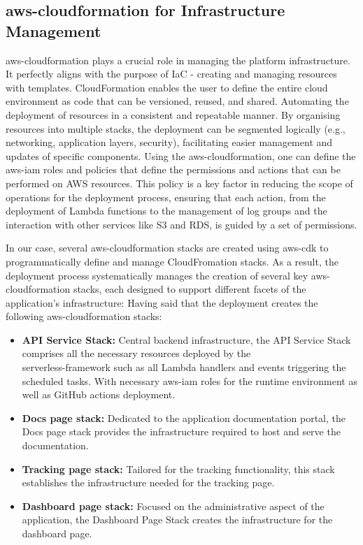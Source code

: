 \subsection{\gls{aws-cloudformation} for Infrastructure Management}
\label{subsec:aws-cloudformation-infrastructure}

\gls{aws-cloudformation} plays a crucial role in managing the platform infrastructure.
It perfectly aligns with the purpose of \ac{IaC} - creating and managing resources with templates.
CloudFormation enables the user to define the entire cloud environment as code that can be versioned, reused, and shared. 
Automating the deployment of resources in a consistent and repeatable manner.
By organising resources into multiple stacks, the deployment can be segmented logically (e.g., networking, application layers, security), facilitating easier management and updates of specific components.
Using the \gls{aws-cloudformation}, one can define the \gls{aws-iam} roles and policies that define the permissions and actions that can be performed on \ac{AWS} resources.
This policy is a key factor in reducing the scope of operations for the deployment process, ensuring that each action, from the deployment of Lambda functions to the management of log groups and the interaction with other services like \ac{S3} and \ac{RDS}, is guided by a set of permissions. 

In our case, several \gls{aws-cloudformation} stacks are created using \gls{aws-cdk} to programmatically define and manage CloudFromation stacks.
As a result, the deployment process systematically manages the creation of several key \gls{aws-cloudformation} stacks, each designed to support different facets of the application's infrastructure:
Having said that the deployment creates the following \gls{aws-cloudformation} stacks:
\begin{itemize}
    \item \textbf{API Service Stack:} Central backend infrastructure, the API Service Stack comprises all the necessary resources deployed by the\\ \gls{serverless-framework} such as all Lambda handlers and events triggering the scheduled tasks.
    With necessary \gls{aws-iam} roles for the runtime environment as well as GitHub actions deployment.
    \item \textbf{Docs page stack:} Dedicated to the application documentation portal, the Docs page stack provides the infrastructure required to host and serve the documentation. 
    \item \textbf{Tracking page stack:} Tailored for the tracking functionality, this stack establishes the infrastructure needed for the tracking page.
    \item \textbf{Dashboard page stack:}  Focused on the administrative aspect of the application, the Dashboard Page Stack creates the infrastructure for the dashboard page. 
\end{itemize}

